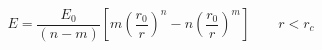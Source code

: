


$$
 E = \frac{E_0}{(n-m)} \left[ m \left(\frac{r_0}{r}\right)^n - 
   n \left(\frac{r_0}{r}\right)^m \right] \qquad r < r_c
$$


